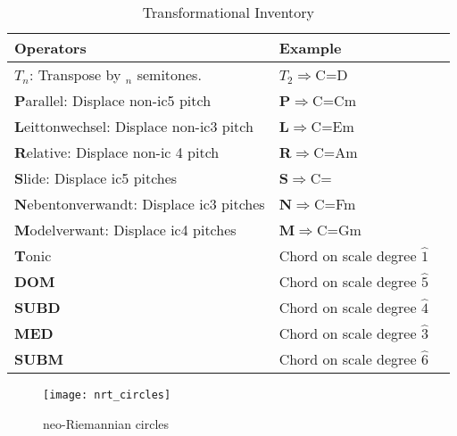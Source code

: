 \begin{table}
	\small
	\begin{tabularx}{\textwidth}{lll}
		\textbf{Operators}                              				& \textbf{Example}                     	\\ 
		\toprule
		\(T_{n}\): Transpose by \(_{n}\) semitones.    		& \textbf{\(T_{2}\)}\(\Rightarrow\)C=D	\\
		\textbf{P}arallel: Displace non-ic5 pitch       		& \textbf{P}\(\Rightarrow\)C=Cm      	\\
		\textbf{L}eittonwechsel: Displace non-ic3 pitch 		& \textbf{L}\(\Rightarrow\)C=Em      	\\
		\textbf{R}elative: Displace non-ic 4 pitch      		& \textbf{R}\(\Rightarrow\)C=Am      	\\
		\textbf{S}lide: Displace ic5 pitches            			& \textbf{S}\(\Rightarrow\)C=\cissm 	\\
		\textbf{N}ebentonverwandt: Displace ic3 pitches 	& \textbf{N}\(\Rightarrow\)C=Fm      	\\
		\textbf{M}odelverwant: Displace ic4 pitches     		& \textbf{M}\(\Rightarrow\)C=Gm     	\\ 
		\textbf{T}onic								& Chord on scale degree \(\hat{1}\) 	\\
		\textbf{DOM}								& Chord on scale degree \(\hat{5}\)	\\
		\textbf{SUBD}								& Chord on scale degree \(\hat{4}\)	\\
		\textbf{MED}								& Chord on scale degree \(\hat{3}\)	\\
		\textbf{SUBM}								& Chord on scale degree \(\hat{6}\)	\\
		\bottomrule
	\end{tabularx}  
	\caption{Transformational Inventory}
    	\label{tb:transformational_inventory}
\end{table}

\begin{figure*}[h!]
\texttt{\texttt{[image: nrt\_circles]}
}\caption{neo-Riemannian circles}
\label{fg:nrt_circles}
\end{figure*} 

